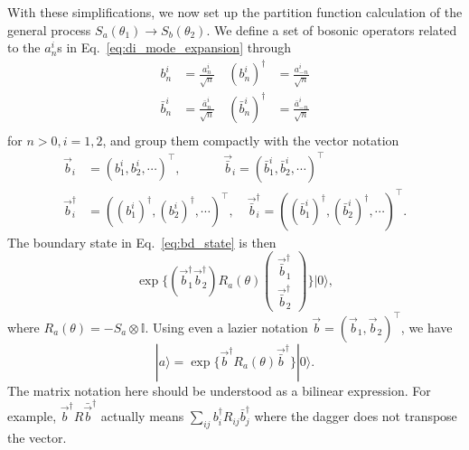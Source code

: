 With these simplifications, we now set up the partition function calculation of the general process $S_a( \theta_1 ) \rightarrow S_b( \theta_2)$. We define a set of bosonic operators related to the $a^i_n$s in Eq.~\eqref{eq:di_mode_expansion} through
\begin{equation}
\begin{aligned}
b^i_n &= \frac{a^i_n}{\sqrt{n}} \quad (b^i_n)^{\dagger} &= \frac{a^i_{-n}}{\sqrt{n}} \\
\bar{b}^i_n &= \frac{\bar{a}^i_n}{\sqrt{n}} \quad (\bar{b}^i_n)^{\dagger} &= \frac{\bar{a}^i_{-n}}{\sqrt{n}} \\
\end{aligned}
\end{equation}
for $n > 0 , i = 1, 2$, and group them compactly with the vector notation
\begin{equation}
\begin{aligned}
\vec{b}_i &= ( b^i_1, b^i_2, \cdots )^\top, \qquad \,\,\quad \vec{\bar{b}}_i = ( \bar{b}^i_1, \bar{b}^i_2, \cdots )^\top\\
\vec{b}^\dagger_i &= ( (b^i_1)^\dagger, (b^i_2)^\dagger, \cdots )^\top, \quad\vec{\bar{b}}^{\dagger}_i = ( (\bar{b}^i_1)^\dagger, (\bar{b}^i_2)^\dagger, \cdots )^\top.
\end{aligned}
\end{equation}
The boundary state in Eq.~\eqref{eq:bd_state} is then 
\begin{equation}
\exp\Big\{  (\vec{b}_1^{\dagger} \vec{b}_2^{\dagger} ) R_a( \theta )   
\begin{pmatrix}
  \vec{\bar{b}}_1^{\dagger}\\
  \vec{\bar{b}}_2^{\dagger}
\end{pmatrix}\Big\}  |0  \rangle ,
\end{equation}
where $R_a( \theta ) = -S_a \otimes \mathbb{I}$. Using even a lazier notation $\vec{b} = ( \vec{b}_1, \vec{b}_2 )^\top$, we have
\begin{equation}
\label{eq:bd_state_matrix}
|a \rangle = \exp\Big\{  \vec{b}^{\dagger} R_a( \theta )    \vec{\bar{b}}^{\dagger} \Big\} |0 \rangle .
\end{equation}
The matrix notation here should be understood as a bilinear expression. For example, $\vec{b}^{\dagger} R \bar{\vec{b}}^{\dagger}$ actually means $\sum_{ij}b^\dagger_iR_{ij}\bar{b}_j^\dagger$ where the dagger does not transpose the vector.

